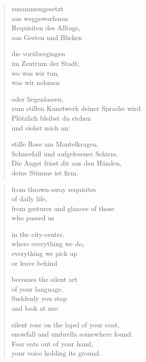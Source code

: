 \clearpage

\begin{verse}

zusammengesetzt\\
aus weggeworfenen\\
Requisiten des Alltags,\\
aus Gesten und Blicken

die vorübergingen\\
im Zentrum der Stadt;\\
wo was wir tun,\\
was wir nehmen

oder liegenlassen,\\
zum stillen Kunstwerk deiner Sprache wird.\\
Plötzlich bleibst du stehen\\
und siehst mich an:

stille Rose am Mantelkragen,\\
Schneefall und aufgelesener Schirm.\\
Die Angst frisst dir aus den Händen,\\
deine Stimme ist firm.

\end{verse}

\clearpage

\begin{verse}
from thrown-away requisites\\
of daily life,\\
from gestures and glances of those\\
who passed us

in the city-centre,\\
where everything we do,\\
everything we pick up\\
or leave behind

becomes the silent art\\
of your language.\\
Suddenly you stop\\
and look at me:

silent rose on the lapel of your coat,\\
snowfall and umbrella somewhere found.\\
Fear eats out of your hand,\\
your voice holding its ground.

\end{verse}

